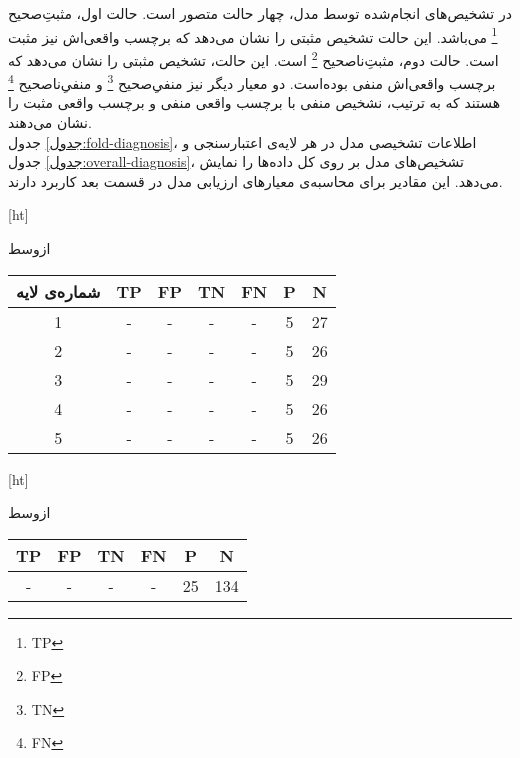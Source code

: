 در تشخیص‌های انجام‌شده توسط مدل، چهار حالت متصور است.
حالت اول، مثبتِ‌صحیح
\footnote{TP}
می‌باشد.
این حالت تشخیص مثبتی را نشان می‌دهد که برچسب واقعی‌اش نیز مثبت است.
حالت دوم، مثبتِ‌ناصحیح
\footnote{FP}
است.
این حالت، تشخیص مثبتی را نشان می‌دهد که برچسب واقعی‌اش منفی بوده‌است.
دو معیار دیگر نیز منفیِ‌صحیح
\footnote{TN}
و منفیِ‌ناصحیح
\footnote{FN}
هستند که به ترتیب، نشخیص منفی با برچسب واقعی منفی و برچسب واقعی مثبت را نشان می‌دهند.\\

جدول \ref{جدول:fold-diagnosis}، اطلاعات تشخیصی مدل در
هر لایه‌ی اعتبارسنجی و جدول \ref{جدول:overall-diagnosis}،
تشخیص‌های مدل بر روی کل داده‌ها را نمایش می‌دهد.
این مقادیر برای محاسبه‌ی معیار‌های ارزیابی مدل در قسمت بعد کاربرد دارند.

[ht]

\vspace{1.5em}

‌ازوسط

\begin{tabular}{ccccccc}
    \hline
     
    شماره‌ی لایه & TP & FP & TN & FN & P & N  \\ \hline
    1                                    & -                          & -  & -  & -  & 5 & 27 \\ 
    2                                    & -                          & -  & -  & -  & 5 & 26 \\ 
    3                                    & -                          & -  & -  & -  & 5 & 29 \\ 
    4                                    & -                          & -  & -  & -  & 5 & 26 \\ 
    5                                    & -                          & -  & -  & -  & 5 & 26 \\ \hline
    \end{tabular}


[ht]

\vspace{1.5em}

‌ازوسط

\begin{tabular}{cccccc}
    \hline
     
    TP & FP & TN & FN & P  & N   \\ \hline
    -                          & -  & -  & -  & 25 & 134 \\ \hline
    \end{tabular}

